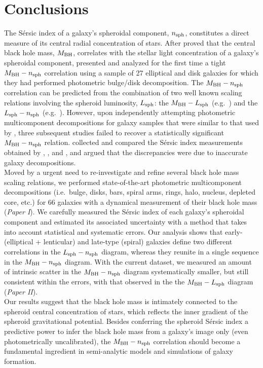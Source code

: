 \documentclass[preprint2]{emulateapj}
\begin{document}
\section{Conclusions} 
The S\'ersic index of a galaxy's spheroidal component, $n_{\rm sph}$, constitutes a direct measure 
of its central radial concentration of stars. 
After \cite{graham2001bulges} proved that the central black hole mass, $M_{\rm BH}$, 
correlates with the stellar light concentration of a galaxy's spheroidal component, 
\cite{grahamdriver2007} presented and analyzed for the first time a tight $M_{\rm BH} - n_{\rm sph}$ correlation 
using a sample of 27 elliptical and disk galaxies for which they had performed photometric bulge/disk decomposition. 
The $M_{\rm BH} - n_{\rm sph}$ correlation can be predicted from the combination of two well known scaling relations 
involving the spheroid luminosity, $L_{\rm sph}$: 
the $M_{\rm BH} - L_{\rm sph}$ (e.g.~\citealt{kormendyrichstone1995,magorrian1998,marconihunt2003,haringrix2004}) 
and the $L_{\rm sph} - n_{\rm sph}$ (e.g.~\citealt{youngcurrie1994,jerjen2000,grahamguzman2003}). 
However, upon independently attempting photometric multicomponent decompositions 
for galaxy samples that were similar to that used by \cite{grahamdriver2007}, 
three subsequent studies \citep{sani2011,vika2012,beifiori2012} failed to recover a statistically significant $M_{\rm BH} - n_{\rm sph}$ relation. 
\cite{savorgnan2013} collected and compared the S\'ersic index measurements obtained by \cite{grahamdriver2007}, 
\cite{sani2011}, \cite{vika2012} and \cite{beifiori2012}, 
and argued that the discrepancies were due to inaccurate galaxy decompositions. \\
Moved by a urgent need to re-investigate and refine several black hole mass scaling relations, 
we performed state-of-the-art photometric multicomponent decompositions 
(i.e.~bulge, disks, bars, spiral arms, rings, halo, nucleus, depleted core, etc.) 
for 66 galaxies with a dynamical measurement of their black hole mass (\emph{Paper I}). 
We carefully measured the S\'ersic index of each galaxy's spheroidal component 
and estimated its associated uncertainty with a method that takes into account statistical and systematic errors. 
Our analysis shows that early- (elliptical + lenticular) and late-type (spiral) galaxies define two different correlations 
in the $L_{\rm sph} - n_{\rm sph}$ diagram, 
whereas they reunite in a single sequence in the $M_{\rm BH} - n_{\rm sph}$ diagram. 
With the current dataset, we measured an amount of intrinsic scatter in the $M_{\rm BH} - n_{\rm sph}$ diagram systematically smaller, 
but still consistent within the errors, with that observed in the the $M_{\rm BH} - L_{\rm sph}$ diagram (\emph{Paper II}). \\ 
Our results suggest that the black hole mass is intimately connected to the spheroid central concentration of stars, 
which reflects the inner gradient of the spheroid gravitational potential. 
Besides conferring the spheroid S\'ersic index a predictive power to infer the black hole mass 
from a galaxy's image only (even photometrically uncalibrated), 
the $M_{\rm BH} - n_{\rm sph}$ correlation should become a fundamental ingredient in semi-analytic models and simulations of galaxy formation. 
\end{document}

